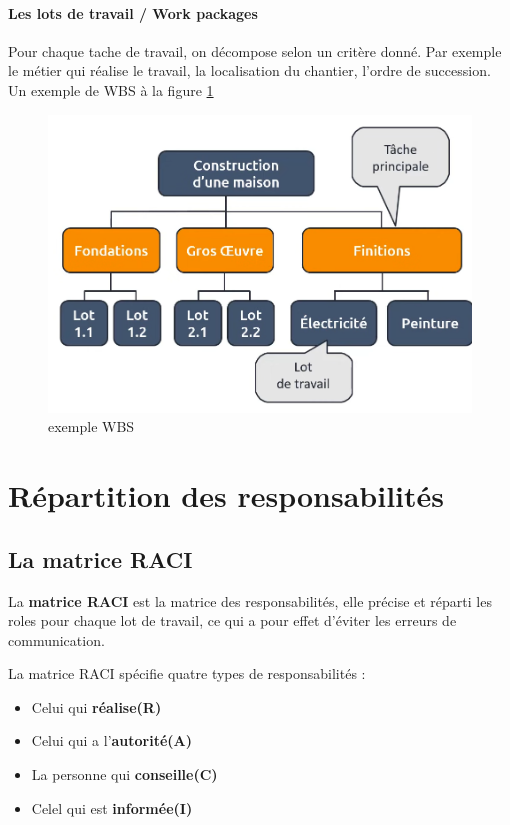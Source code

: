 \paragraph*{Les lots de travail / Work packages}
Pour chaque tache de travail, on décompose selon un critère donné. Par exemple le métier qui réalise le travail, la localisation du chantier, l'ordre de succession.
Un exemple de WBS à la figure \ref{fig:exemple_wbs}
\begin{figure}[!h]
	\begin{center}
		\includegraphics[scale=0.2]{images/exemple_wbs.png}
		\caption{exemple WBS}
		\label{fig:exemple_wbs}
	\end{center}
\end{figure}
\section{Répartition des responsabilités}

\subsection{La matrice RACI}
La \textbf{matrice RACI} est la matrice des responsabilités, elle précise et réparti les roles pour chaque lot de travail, ce qui a pour effet d'éviter les erreurs de communication.

La matrice RACI spécifie quatre types de responsabilités : 
\begin{itemize}
	\item Celui qui \textbf{réalise(R)}
	\item Celui qui a l'\textbf{autorité(A)}
	\item La personne qui \textbf{conseille(C)}
	\item Celel qui est \textbf{informée(I)}
\end{itemize}
